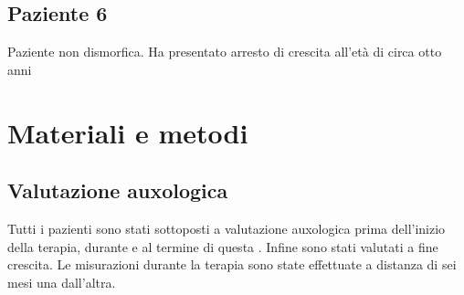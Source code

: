 \clearpage

\subsection*{Paziente 6}%

Paziente non dismorfica. Ha presentato arresto di crescita all'età di circa otto anni  

\clearpage

\section{Materiali e metodi}

\subsection{Valutazione auxologica}
Tutti i pazienti sono stati sottoposti a valutazione auxologica prima dell'inizio della terapia, durante e al termine di questa . Infine sono stati valutati a fine crescita. Le misurazioni durante la terapia sono state effettuate a distanza di sei mesi una dall'altra.

